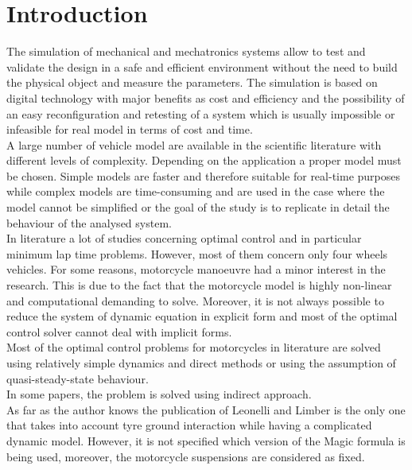 \chapter*{Introduction}
%
The simulation of mechanical and mechatronics systems allow to test and validate the design in a safe and efficient environment without the need to build the physical object and measure the parameters. The simulation is based on digital technology with major benefits as cost and efficiency and the possibility of an easy reconfiguration and retesting of a system which is usually impossible or infeasible for real model in terms of cost and time.\cite{maria1997introduction}\\
A large number of vehicle model are available in the scientific literature with different levels of complexity. Depending on the application a proper model must be chosen. Simple models are faster and therefore suitable for real-time purposes while complex models are time-consuming and are used in the case where the model cannot be simplified or the goal of the study is to replicate in detail the behaviour of the analysed system.\\
%
In literature a lot of studies concerning optimal control and in particular minimum lap time problems. However, most of them concern only four wheels vehicles. For some reasons, motorcycle manoeuvre had a minor interest in the research. This is due to the fact that the motorcycle model is highly non-linear and computational demanding to solve. Moreover, it is not always possible to reduce the system of dynamic equation in explicit form and most of the optimal control solver cannot deal with implicit forms.\\
Most of the optimal control problems for motorcycles in literature are solved using relatively simple dynamics and direct methods\cite{sharp2014method,leonelli2019optimal} or using the assumption of quasi-steady-state behaviour.\cite{cossalter1999general,simon2008application}\\
In some papers, the problem is solved using indirect approach\cite{bertolazzi2006symbolic}.\\ 
As far as the author knows the publication of Leonelli and Limber\cite{leonelli2019optimal} is the only one that takes into account tyre ground interaction while having a complicated dynamic model. However, it is not specified which version of the Magic formula is being used, moreover, the motorcycle suspensions are considered as fixed.\\   
